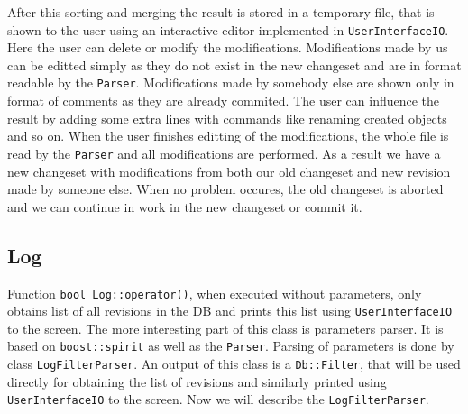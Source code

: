 \documentclass[deska]{subfiles}
\begin{document}
After this sorting and merging the result is stored in a temporary file, that is shown to the user using an interactive editor
implemented in {\tt UserInterfaceIO}. Here the user can delete or modify the modifications. Modifications made by us can be
editted simply as they do not exist in the new changeset and are in format readable by the {\tt Parser}. Modifications made by
somebody else are shown only in format of comments as they are already commited. The user can influence the result by
adding some extra lines with commands like renaming created objects and so on. When the user finishes editting of the
modifications, the whole file is read by the {\tt Parser} and all modifications are performed. As a result we have a
new changeset with modifications from both our old changeset and new revision made by someone else. When no problem
occures, the old changeset is aborted and we can continue in work in the new changeset or commit it.

\subsection{Log}

Function {\tt bool Log::operator()}, when executed without parameters, only obtains list of all revisions in the DB and
prints this list using {\tt UserInterfaceIO} to the screen. The more interesting part of this class is parameters parser.
It is based on {\tt boost::spirit} as well as the {\tt Parser}. Parsing of parameters is done by class {\tt LogFilterParser}.
An output of this class is a {\tt Db::Filter}, that will be used directly for obtaining the list of revisions and similarly
printed using {\tt UserInterfaceIO} to the screen. Now we will describe the {\tt LogFilterParser}.
\end{document}
